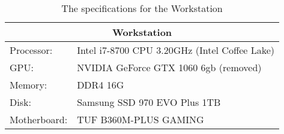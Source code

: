 \begin{table}[H]
    \begin{tabular}{ll}
    \hline
    \multicolumn{2}{|c|}{Workstation}           \\ \hline
    Processor:   & Intel i7-8700 CPU 3.20GHz (Intel Coffee Lake)\\
    GPU:         & NVIDIA GeForce GTX 1060 6gb (removed) \\
    Memory:      & DDR4 16G                     \\
    Disk:        & Samsung SSD 970 EVO Plus 1TB \\
    Motherboard: & TUF B360M-PLUS GAMING       
    \end{tabular}
    \caption{The specifications for the Workstation}
    \label{tab:komplett}
\end{table}